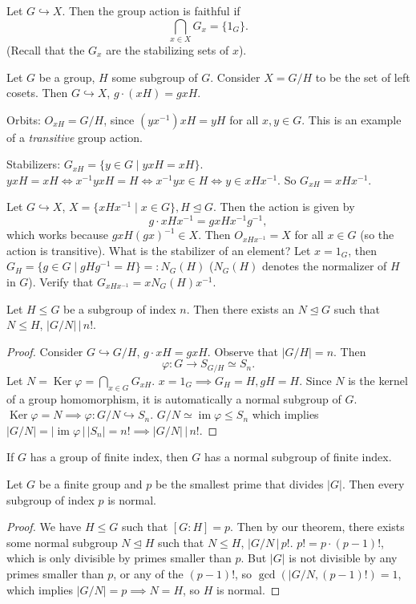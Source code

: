 \begin{definition}
    Let $G \hookrightarrow X$. Then the group action is faithful if \[
    \bigcap_{x\in X} G_x = \{1_G\} .
\] (Recall that the $G_x$ are the stabilizing sets of $x$).
\end{definition}
\begin{example}
    Let $G$ be a group, $H$ some subgroup of $G$. Consider $X=G/H$ to be the set of left cosets. Then $G \hookrightarrow X$, $g\cdot (xH)=gxH$.

    Orbits: $O_{xH}=G/H$, since $(yx^{-1})xH=yH$ for all $x,y \in G$. This is an example of a \emph{transitive} group action.

    Stabilizers: $G_{xH}=\{y\in G \mid yxH=xH\}$. $yxH=xH \iff x^{-1}yxH=H \iff x^{-1}yx \in H \iff y\in xHx^{-1}$. So $G_{xH}=xHx^{-1}$.
\end{example}
\begin{example}
    Let $G \hookrightarrow X$, $X=\{xHx^{-1} \mid x\in G\}, H \trianglelefteq G$. Then the action is given by \[
    g\cdot xHx^{-1}=gxHx^{-1}g^{-1},
\] which works because $gxH(gx)^{-1}\in X$. Then $O_{xHx^{-1}}=X$ for all $x\in G$ (so the action is transitive). What is the stabilizer of an element? Let $x=1_G$, then $G_H=\{g\in G \mid gHg^{-1}=H\} =: N_G(H) $ ($N_G(H)$ denotes the normalizer of $H$ in $G$). Verify that $G_{xHx^{-1}}=xN_G(H)x^{-1}$.
\end{example}
\begin{theorem}
    Let $H \leq G$ be a subgroup of index $n$. Then there exists an $N \trianglelefteq G$ such that $N \leq H$, $|G/N| \,\big|\, n!$.
\end{theorem}
\begin{proof}
Consider $G \hookrightarrow G/H$, $g\cdot xH=gxH$. Observe that $|G/H|=n$. Then \[
\varphi \colon G \to S_{G/H} \simeq S_n.
\] Let $N=\operatorname{Ker}\varphi=\bigcap_{x\in G} G_{xH}$. $x=1_G \implies G_H=H, gH=H$. Since $N$ is the kernel of a group homomorphism, it is automatically a normal subgroup of $G$. $\operatorname{Ker}\varphi=N \implies  \varphi: G/N \hookrightarrow S_n$. $G/N \simeq \operatorname{im}\varphi \leq S_n$ which implies $|G/N| = |\operatorname{im}\varphi \,\big| \, |S_n| = n! \implies |G/N| \,\big|\, n!$.

\end{proof}
\begin{cor}
    If $G$ has a group of finite index, then $G$ has a normal subgroup of finite index.
\end{cor}
\begin{cor}
    Let $G$ be a finite group and $p$ be the smallest prime that divides $|G|$. Then every subgroup of index $p$ is normal.
\end{cor}
\begin{proof}
    We have $H \leq G$ such that $[G:H]=p$. Then by our theorem, there exists some normal subgroup $N \trianglelefteq H$ such that $N \leq H$, $|G/N \,\big|\, p!$. $p!=p\cdot (p-1)!$, which is only divisible by primes smaller than $p$. But $|G|$ is not divisible by any primes smaller than $p$, or any of the $(p-1)!$, so $\gcd\left( |G /N, (p-1)! \right)=1 $, which implies $|G /N|=p \implies N=H$, so $H$ is normal.
\end{proof}

